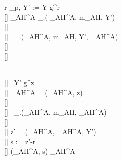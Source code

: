 \begin{figure*}
{\begin{minipage}{1.4\textwidth}
\begin{pchstack}[boxed]
{ 	\pcln r \sample \ZZ_p, Y' := Y \cdot g^r \< \< \\ [-0.15\baselineskip][]
 	\pcln \tilde{\sigma}_{AH}^A \gets \Pi_\ADP.\presig( \sk_{AH}^A, m_{AH}, Y') \< \< \\ [-0.85\baselineskip][] 
 	\pcln \<  \< \\ [-0.55\baselineskip][]
 	\pcln \< \< \ \Pi_\ADP.\prevrfy(\vk_{AH}^A, m_{AH}, Y', \tilde{\sigma}_{AH}^A) \  \\ [-0.15\baselineskip][]
 	\< \< \quad \pcreturn \bot\\ [-0.15\baselineskip][]
 	\pcln \< \begin{subprocedure}
 	\end{subprocedure}
 	\< \\ [-0.15\baselineskip][]
 	\pcln \< \< \ Y' \neq g^z\ \ \pcreturn \bot\\ [-0.15\baselineskip][]
 	\pcln \< \< \sigma_{AH}^A \gets \Pi_\ADP.\adapt(\tilde{\sigma}_{AH}^A, z)\\ [-0.85\baselineskip][]
 	\pcln \<  \< \\ [-0.55\baselineskip][]
 	\pcln {}\ \Pi_\ADP.\vrfy(\vk_{AH}^A, m_{AH}, \sigma_{AH}^A) \  \< \< \\ [-0.15\baselineskip][]
 	\pcln \quad \pcreturn \bot \< \< \\ [-0.15\baselineskip][]
 	\pcln z' \gets \Pi_\ADP.\ext(\tilde{\sigma}_{AH}^A, \sigma_{AH}^A, Y')\< \< \\ [-0.15\baselineskip][]
 	\pcln s := z'-r \< \< \\ [-0.15\baselineskip][]
 	\pcln \pcreturn (\sigma_{AH}^A, s) \< \< \pcreturn \sigma_{AH}^A
}
\end{pchstack}
\begin{center}
    \begin{pchstack}[boxed]
    

\end{pchstack}
\end{center}
\end{minipage}}
\end{figure*}
